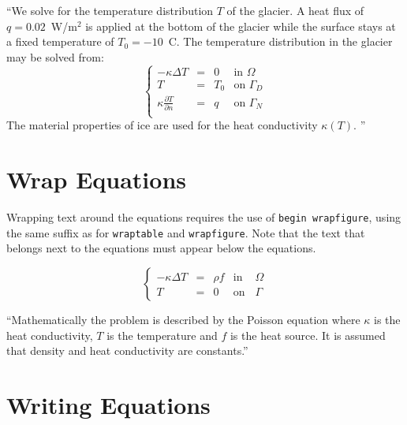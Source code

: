 ``We solve for the temperature distribution $T$ of the glacier. A heat flux of $q=0.02$~W/m$^2$ is applied at the bottom of the glacier while the surface stays at a fixed temperature of $T_0=-10$~C. The temperature distribution in the glacier may be solved from:
\begin{equation}
\left \{
\begin{array}{cccc}
- \kappa \Delta T &= & 0 & \mathrm{ in } \, \, \Omega \\
T&=&T_0 & \mathrm{ on } \, \, \Gamma_D \\
\kappa \frac{\partial T}{\partial n} &=& q & \mathrm{ on } \,\, \Gamma_N \\
\end{array}
\right .
\end{equation}
The material properties of ice are used for the heat conductivity $\kappa(T)$.  ''\\



\section{Wrap Equations}

Wrapping text around the equations requires the use of \texttt{begin wrapfigure}, using the same suffix as for \texttt{wraptable} and \texttt{wrapfigure}.  Note that the text that belongs next to the equations must appear below the equations.\\

\begin{figure}
\begin{equation}
\left \{
\begin{array}{ccccc}
- \kappa \Delta T &= &\rho f & \mathrm{ in } \, \, & \Omega \\
T&=&0 & \mathrm{ on } & \Gamma
\end{array}
\right .
\end{equation}
\end{figure}

``Mathematically the problem is described by the Poisson equation where $\kappa$ is the heat conductivity, $T$  is the temperature and $f$ is the heat source. It is assumed that density and heat conductivity are constants.''\\

\section{Writing Equations}

